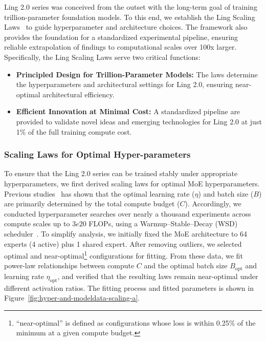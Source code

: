\documentclass[table]{gtech}
\theoremstyle{definition}
\begin{document}
Ling 2.0 series was conceived from the outset with the long-term goal of training trillion-parameter foundation models. 
To this end, we establish the Ling Scaling Laws~\citep{tian2025greaterleveragescalinglaws} to guide hyperparameter and architecture choices. 
The framework also provides the foundation for a standardized experimental pipeline, ensuring reliable extrapolation of findings to computational scales over 100x larger.
Specifically, the Ling Scaling Laws serve two critical functions:
\begin{itemize}
\item 
\textbf{Principled Design for Trillion-Parameter Models:} 
The laws determine the hyperparameters and architectural settings for Ling 2.0, ensuring near-optimal architectural efficiency.
\item \textbf{Efficient Innovation at Minimal Cost:}
A standardized pipeline are provided to validate novel ideas and emerging technologies for Ling 2.0 at just 1\% of the full training compute cost. 
\end{itemize}

\subsubsection{Scaling Laws for Optimal Hyper-parameters}
\label{sec:scaling4parametres}
To ensure that the Ling 2.0 series can be trained stably under appropriate hyperparameters, we first derived scaling laws for optimal MoE hyperparameters. Previous studies~\citep{bi2024deepseek, team2025every} has shown that the optimal learning rate ($\eta$) and batch size ($B$) are primarily determined by the total compute budget ($C$). Accordingly, we conducted hyperparameter searches over nearly a thousand experiments across compute scales up to $3e{20}$ FLOPs, using a Warmup–Stable–Decay (WSD) scheduler~\citep{hu2024minicpm}.  
To simplify analysis, we initially fixed the MoE architecture to 64 experts (4 active) plus 1 shared expert. After removing outliers, we selected optimal and near-optimal\footnote{``near-optimal'' is defined as configurations whose loss is within 0.25\% of the minimum at a given compute budget.} configurations for fitting. From these data, we fit power-law relationships between compute $C$ and the optimal batch size $B_{\mathrm{opt}}$ and learning rate $\eta_{\mathrm{opt}}$, and verified that the resulting laws remain near-optimal under different activation ratios. The fitting process and fitted parameters is shown in Figure~\ref{fig:hyper-and-modeldata-scaling-a}.
\end{document}
